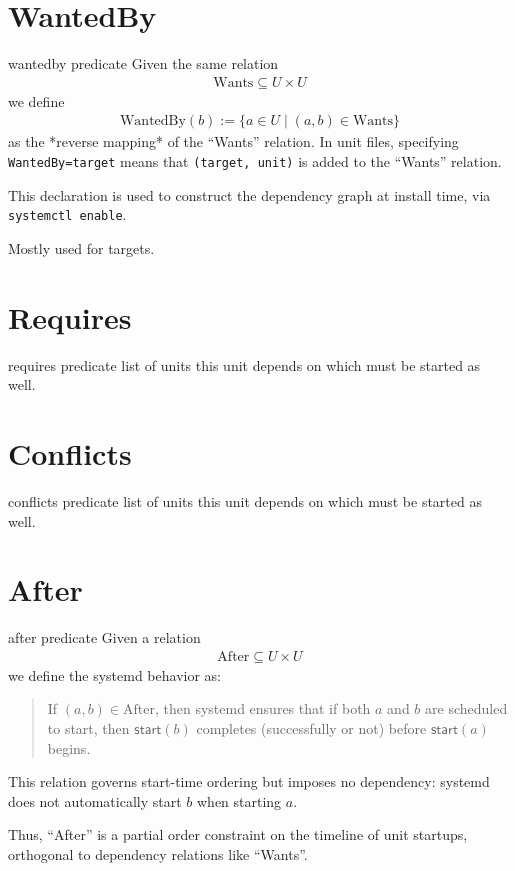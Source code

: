 \documentclass[openany, 12pt]{book}
\begin{document}
\section{WantedBy}
\begin{definition}{wantedby predicate}{}
	Given the same relation
	\begin{align*}
		\text{Wants} \subseteq U \times U
	\end{align*}
	we define
	\begin{align*}
		\text{WantedBy}(b) := \{ a \in U \mid (a, b) \in \text{Wants} \}
	\end{align*}
	as the *reverse mapping* of the ``Wants'' relation. In unit files, specifying
	\texttt{WantedBy=target} means that \texttt{(target, unit)} is added to the
	``Wants'' relation.

	This declaration is used to construct the dependency graph at install time,
	via \texttt{systemctl enable}.

	Mostly used for targets.
\end{definition}

\section{Requires}
\begin{definition}{requires predicate}{}
	list of units this unit depends on which must be started as well.
\end{definition}

\section{Conflicts}
\begin{definition}{conflicts predicate}{}
	list of units this unit depends on which must be started as well.
\end{definition}

\section{After}
\begin{definition}{after predicate}{}
	Given a relation
	\begin{align*}
		\text{After} \subseteq U \times U
	\end{align*}
	we define the systemd behavior as:

	\begin{quote}
		If $(a, b) \in \text{After}$, then systemd ensures that if both $a$ and
		$b$ are scheduled to start, then $\mathsf{start}(b)$ completes
		(successfully or not) before $\mathsf{start}(a)$ begins.
	\end{quote}

	This relation governs start-time ordering but imposes no dependency: systemd
	does not automatically start $b$ when starting $a$.

	Thus, ``After'' is a partial order constraint on the timeline of unit
	startups, orthogonal to dependency relations like ``Wants''.
\end{definition}
\end{document}
